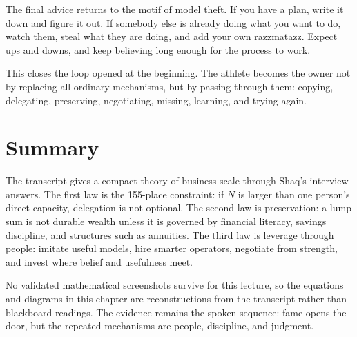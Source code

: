 The final advice returns to the motif of model theft. If you have a plan, write it down and figure it out. If somebody else is already doing what you want to do, watch them, steal what they are doing, and add your own razzmatazz. Expect ups and downs, and keep believing long enough for the process to work.

This closes the loop opened at the beginning. The athlete becomes the owner not by replacing all ordinary mechanisms, but by passing through them: copying, delegating, preserving, negotiating, missing, learning, and trying again.

\section{Summary}

The transcript gives a compact theory of business scale through Shaq's interview answers. The first law is the 155-place constraint: if \(N\) is larger than one person's direct capacity, delegation is not optional. The second law is preservation: a lump sum is not durable wealth unless it is governed by financial literacy, savings discipline, and structures such as annuities. The third law is leverage through people: imitate useful models, hire smarter operators, negotiate from strength, and invest where belief and usefulness meet.

No validated mathematical screenshots survive for this lecture, so the equations and diagrams in this chapter are reconstructions from the transcript rather than blackboard readings. The evidence remains the spoken sequence: fame opens the door, but the repeated mechanisms are people, discipline, and judgment.